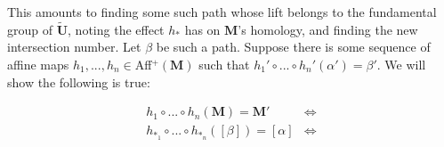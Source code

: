 \documentclass[]{article}
\newtheorem{thm}{Theorem}[subsection]
\newtheorem{Def}{Definition}[subsection]
\begin{document}
This amounts to finding some such path whose lift belongs to the fundamental group of $\tilde{\mathbf U}$, noting the effect $h_*$ has on $\mathbf M$'s homology, and finding the new intersection number. Let $\beta$ be such a path. Suppose there is some sequence of affine maps $h_1,...,h_n\in$Aff$^+(\mathbf{M})$ such that $h_1' \circ ... \circ h_n'(\alpha')=\beta'$. We will show the following is true:

\begin{align*}
h_1 \circ ... \circ h_n(\mathbf{M})=\mathbf{M}'&\iff\\
h_{*_1} \circ ... \circ h_{*_n}([\beta])=[\alpha] &\iff
\end{align*}
%
%
%
%
\end{document}
